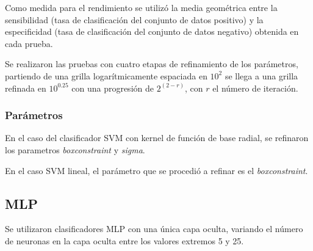 \documentclass[12pt,bibliography=oldstyle,DIV=12,parskip=half-,titlepage]{scrartcl}
\begin{document}

Como medida para el rendimiento se utilizó la media geométrica entre
la sensibilidad (tasa de clasificación del conjunto de datos positivo)
y la especificidad (tasa de clasificación del conjunto de datos negativo)
obtenida en cada prueba.

Se realizaron las pruebas con cuatro etapas de refinamiento de los parámetros,
partiendo de una grilla logarítmicamente espaciada en $10^2$ se llega a una
grilla refinada en $10^{0.25}$ con una progresión de $2^{(2-r)}$, con $r$ 
el número de iteración.
\subsubsection{Parámetros}
En el caso del clasificador SVM con kernel de función de base radial,
se refinaron los parametros \emph{boxconstraint} y \emph{sigma}.

En el caso SVM lineal, el parámetro que se procedió a refinar es
el \emph{boxconstraint}.
\subsection{MLP}
Se utilizaron clasificadores MLP con una única capa oculta, variando
el número de neuronas en la capa oculta entre los valores extremos 5 y 25.
\end{document}
